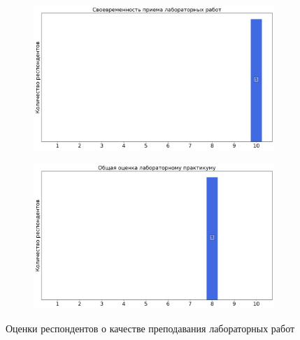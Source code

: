 \begin{figure}[H]
\begin{subfigure}[b]{0.45\textwidth}
				\includegraphics[width=\textwidth]{images/2 course/Общая физика - электричество и магнетизм/labniks-marks-Нухов А.К.-2.png}
			\end{subfigure}
			\begin{subfigure}[b]{0.45\textwidth}
				\centering
				\includegraphics[width=\textwidth]{images/2 course/Общая физика - электричество и магнетизм/labniks-marks-Нухов А.К.-3.png}
			\end{subfigure}	
			\caption{Оценки респондентов о качестве преподавания лабораторных работ}
		\end{figure}



